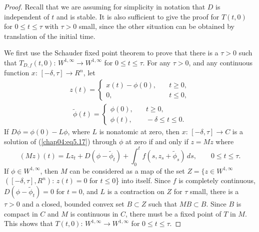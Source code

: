 \documentclass{surv-l}
\theoremstyle{plain}
\theoremstyle{definition}
\numberwithin{equation}{section}
\numberwithin{figure}{chapter}
\begin{document}
\begin{proof} Recall that we are assuming for simplicity in notation that $D$ is independent of $t$ and is stable. It is also sufficient to give the proof for $T(t, 0)$ for $0\leq t\leq\tau$ with $\tau>0$ small, since the other situation can be obtained by translation of the initial time.

We first use the Schauder fixed point theorem to prove that there is a $\tau >0$ such that $T_{D,f}(t, 0):\,W^{1,\infty}\rightarrow W^{1,\infty}$ for $0\leq t\leq\tau$. For any $\tau>0$, and any continuous function $x:\,[-\delta, \tau]\rightarrow R^{n}$, let
\begin{align*}
z(t)=\left\{\begin{array}{ll}
x(t)-\phi(0), &\quad t\geq 0,\\
0, &\quad t\leq 0,
\end{array}\right.
\end{align*}
\begin{align*}
\tilde{\phi}(t)=\left\{\begin{array}{ll}
\phi(0), &\quad t\geq 0,\\
\phi(t), &\quad -\delta\leq t\leq 0.
\end{array}\right.
\end{align*}
If $D\phi=\phi(0)-L\phi$, where $L$ is nonatomic at zero, then $x:\,[-\delta, \tau]\rightarrow C$ is a solution of (\ref{chap04:eq5.17}) through $\phi$ at zero if and only if $z=Mz$ where
\begin{equation*}
(Mz)(t)=Lz_{t}+D(\phi-\tilde{\phi}_{t})+\int_{0}^{t}f(s, z_{s}+\tilde{\phi}_{s})\, ds,\qquad 0\leq t\leq\tau.
\end{equation*}
If $\phi\in W^{1,\infty}$, then $M$ can be considered as a map of the set $Z = \{z\in W^{1,\infty}$ $([-\delta, \tau], R^{n}):\,z(t)=0$ for $t\leq 0$\} into itself. Since $f$ is completely continuous, $D(\phi-\tilde{\phi}_{t})=0$ for $t=0$, and $L$ is a contraction on $Z$ for $\tau$ small, there is a $\tau>0$ and a closed, bounded convex set $B\subset Z$ such that $M B\subset B$. Since $B$ is compact in $C$ and $M$ is continuous in $C$, there must be a fixed point of $T$ in $M$. This shows that $T(t, 0):\,W^{1,\infty}\rightarrow W^{1,\infty}$ for $ 0\leq t\leq\tau$.


\end{proof}
\end{document}
